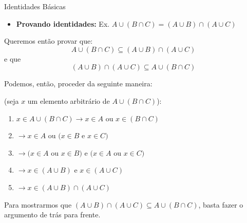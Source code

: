 \documentclass[aspectratio=169]{beamer}
\begin{document}
\begin{frame}{Identidades Básicas}
    \begin{itemize}
        \item \textbf{Provando identidades:} Ex. $A \cup (B \cap C) = (A \cup B) \cap (A \cup C)$
    \end{itemize}

    Queremos então provar que:
    \[
    A \cup (B \cap C) \subseteq (A \cup B) \cap (A \cup C)
    \]
    e que
    \[
    (A \cup B) \cap (A \cup C) \subseteq A \cup (B \cap C)
    \]

    Podemos, então, proceder da seguinte maneira: 
    
    \begin{center}
        (seja $x$ um elemento arbitrário de $A \cup (B \cap C)$):
    \end{center}
    
    \begin{multicols}{2}
        \begin{enumerate}
            \item $x \in A \cup (B \cap C) \rightarrow x \in A$ ou $x \in (B \cap C)$
            \item $\rightarrow x \in A$ ou $(x \in B$ e $x \in C)$
            \item $\rightarrow (x \in A$ ou $x \in B)$ e $(x \in A$ ou $x \in C)$
            \item $\rightarrow x \in (A \cup B)$ e $x \in (A \cup C)$
            \item $\rightarrow x \in (A \cup B) \cap (A \cup C)$
        \end{enumerate}
    \end{multicols}
    
    
    Para mostrarmos que $(A \cup B) \cap (A \cup C) \subseteq A \cup (B \cap C)$, basta fazer o argumento de trás para frente.
\end{frame}
\end{document}
